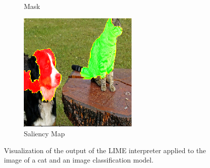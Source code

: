 \begin{figure}[ht]
\begin{subfigure}{0.32\linewidth}
    \caption{Mask}
    \label{fig:bird-a}
  \end{subfigure}
  \begin{subfigure}{0.32\linewidth}
    \includegraphics[width=\linewidth]{figures/lime_cat_map.png}
    \caption{Saliency Map}
    \label{fig:bird-a}
  \end{subfigure}
  \caption{Visualization of the output of the LIME interpreter applied to the image of a cat and an image classification model.}\label{fig:lime_cat}
  \vspace{-0.3cm}
\end{figure}




